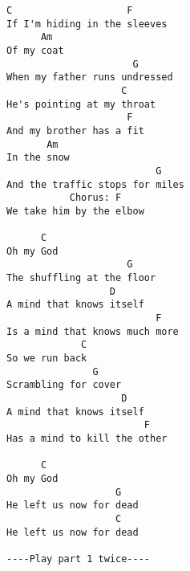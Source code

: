 \documentclass[leqno]{memoir}
\begin{document}
\begin{verbatim}
C                    F
If I'm hiding in the sleeves
      Am
Of my coat
                      G
When my father runs undressed
                    C
He's pointing at my throat
                     F
And my brother has a fit
       Am
In the snow
                          G
And the traffic stops for miles
           Chorus: F
We take him by the elbow

      C
Oh my God
                     G
The shuffling at the floor
                  D
A mind that knows itself
                          F
Is a mind that knows much more
             C
So we run back
               G
Scrambling for cover
                    D
A mind that knows itself
                        F
Has a mind to kill the other

      C
Oh my God
                   G
He left us now for dead
                   C
He left us now for dead

----Play part 1 twice----
\end{verbatim}
\newpage
\end{document}
